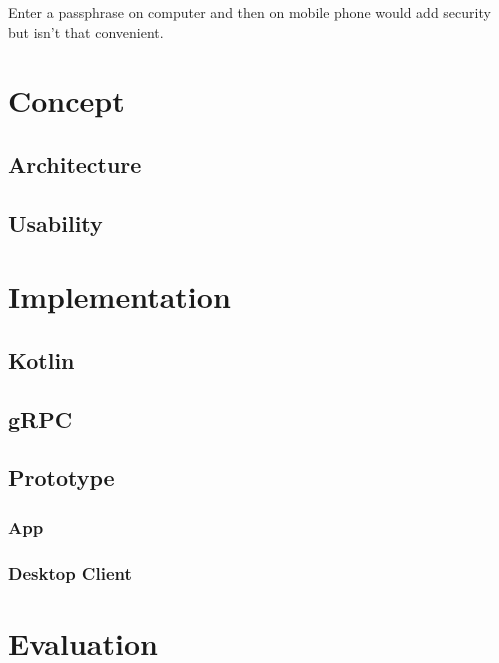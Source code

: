 \documentclass[12pt,oneside,a4paper,parskip]{scrbook}
\begin{document}
Enter a passphrase on computer and then on mobile phone would add security but isn't that convenient.

\chapter{Concept}

\section{Architecture}

\section{Usability}

\chapter{Implementation}

\section{Kotlin}

\section{gRPC}

\section{Prototype}

\subsection{App}

\subsection{Desktop Client}



\chapter{Evaluation}
\end{document}

